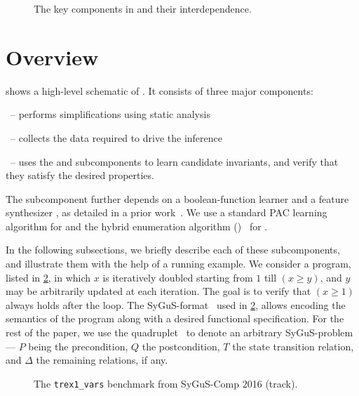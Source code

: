 \documentclass[conference]{IEEEtran}
\begin{document}
\begin{figure}[!t]
\centering
\caption{The key components in \LoopInvGen and their interdependence.}
\label{fig:overview}
\end{figure}





\section{Overview} \label{subsec:Overview}

\noindent
{} shows a high-level schematic of \LoopInvGen.
It consists of three major components:
\begin{andlist}
    \item \Process\ -- performs simplifications using static analysis
    \item \Record\ -- collects the data required to drive the inference
    \item \Infer\ -- uses the \PIE and \Checker subcomponents to learn candidate invariants,
          and verify that they satisfy the desired properties.
\end{andlist}
The \PIE subcomponent further depends on a boolean-function learner \BFL and a feature synthesizer \Synth,
as detailed in a prior work~\citep{Padhi2016DatadrivenPI}.
We use a standard PAC learning algorithm for \BFL and
the hybrid enumeration algorithm (\HEnum)~\citep{Padhi2019OverfittingSTP} for \Synth.

In the following subsections, we briefly describe each of these subcomponents,
and illustrate them with the help of a running example.
We consider a program, listed in \cref{code:sygus},
in which $x$ is iteratively doubled starting from $1$ till $(x \geqslant y)$,
and $y$ may be arbitrarily updated at each iteration.
The goal is to verify that $(x \geqslant 1)$ always holds after the loop.
The SyGuS-\INV format~\citep{Alur2016SyGuSComp2R} used in \cref{code:sygus},
allows encoding the semantics of the program along with a desired functional specification.
For the rest of the paper, we use the quadruplet \SyGuSINVQuadruplet\ to denote an arbitrary SyGuS-\INV problem ---
$P$ being the precondition, $Q$ the postcondition, $T$ the state transition relation, and $\Delta$ the remaining relations, if any.

\begin{figure}[!t]
    \begin{tcolorbox}
          [boxrule=0.5pt,arc=2pt,boxsep=0pt,
           left=2pt,right=-10pt,top=-2pt,bottom=-3pt,
           colback=white,colframe=darkbordercolor]
        
    \end{tcolorbox}
    \caption{The \texttt{trex1\_vars} benchmark from SyGuS-Comp 2016 (\INV track).}
    \label{code:sygus}
\end{figure}
\end{document}
